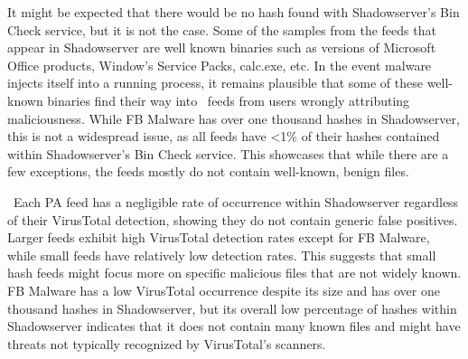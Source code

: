 It might be expected that there would be no hash found with Shadowserver's Bin
Check service, but it is not the case. Some of the samples from the feeds that
appear in Shadowserver are well known binaries such as versions of Microsoft
Office products, Window's Service Packs, calc.exe, etc. In the event malware
injects itself into a running process, it remains plausible that some of these
well-known binaries find their way into \ti\ feeds from users wrongly attributing
maliciousness. While FB Malware has over one thousand hashes in Shadowserver, this
is not a widespread issue, as all feeds have <1\% of their hashes contained within
Shadowserver's Bin Check service.
This showcases that while there are a few exceptions, the feeds mostly do not
contain well-known, benign files.

\finding\ Each PA feed has a negligible rate of occurrence within Shadowserver
regardless of their VirusTotal detection, showing they do not contain generic
false positives. Larger feeds exhibit high VirusTotal detection rates except
for FB Malware, while small feeds have relatively low detection rates.
This suggests that small hash feeds might focus more on specific malicious files
that are not widely known.
FB Malware has a low VirusTotal occurrence despite
its size and has over one thousand hashes in Shadowserver, but its overall low
percentage of hashes within Shadowserver indicates that it does not contain
many known files and might have threats not typically recognized by
VirusTotal's scanners.
